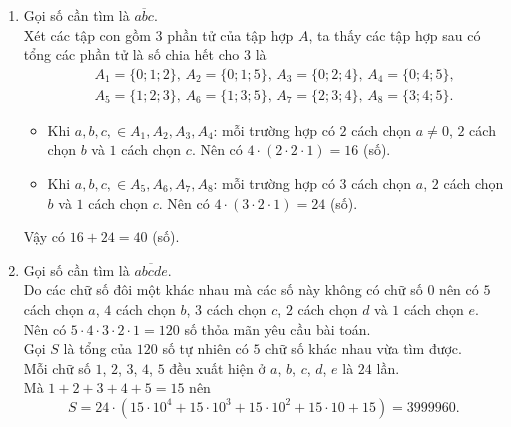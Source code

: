 \begin{bt}
{\begin{enumerate}
			      Vậy có $96+24+54=174$ (số).
			\item Gọi số cần tìm là $\overline{abc}$.\\
			      Xét các tập con gồm $3$ phần tử của tập hợp $A$, ta thấy các tập hợp sau có tổng các phần tử là số chia hết cho $3$ là
			      \allowdisplaybreaks
			      \begin{eqnarray*}
				      & & A_1=\{0;1;2\}, \, A_2=\{0;1;5\}, \, A_3=\{0;2;4\}, \, A_4=\{0;4;5\},\\
				      & & A_5=\{1;2;3\}, \, A_6=\{1;3;5\}, \, A_7=\{2;3;4\}, \, A_8=\{3;4;5\}.
			      \end{eqnarray*}
			      \begin{itemize}
				      \item Khi $a,b,c,\in A_1, A_2, A_3, A_4$: mỗi trường hợp có $2$ cách chọn $a\neq 0$, $2$ cách chọn $b$ và $1$ cách chọn $c$.
				            Nên có $4\cdot (2\cdot 2\cdot 1)=16$ (số).
				      \item Khi $a,b,c,\in A_5, A_6, A_7, A_8$: mỗi trường hợp có $3$ cách chọn $a$, $2$ cách chọn $b$ và $1$ cách chọn $c$.
				            Nên có $4\cdot (3\cdot 2\cdot 1)=24$ (số).
			      \end{itemize}
			      Vậy có $16+24=40$ (số).
			\item Gọi số cần tìm là $\overline{abcde}$.\\
			      Do các chữ số đôi một khác nhau mà các số này không có chữ số $0$ nên có $5$ cách chọn $a$, $4$ cách chọn $b$, $3$ cách chọn $c$, $2$ cách chọn $d$ và $1$ cách chọn $e$.\\
			      Nên có $5\cdot 4\cdot 3\cdot 2\cdot 1=120$ số thỏa mãn yêu cầu bài toán.\\
			      Gọi $S$ là tổng của $120$ số tự nhiên có $5$ chữ số khác nhau vừa tìm được.\\
			      Mỗi chữ số $1$, $2$, $3$, $4$, $5$ đều xuất hiện ở $a$, $b$, $c$, $d$, $e$ là $24$ lần.\\
			      Mà $1+2+3+4+5=15$ nên
			      $$S=24\cdot \left(15\cdot 10^4+15\cdot 10^3+15\cdot 10^2+15\cdot 10+15\right)=3999960.$$
		\end{enumerate}
	}
\end{bt}
